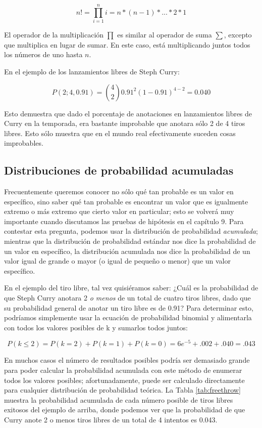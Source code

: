 \documentclass[
  12pt,
]{book}
\begin{document}
\[
n! = \prod_{i=1}^n i = n*(n-1)*...*2*1 
\]

El operador de la multiplicación \(\prod\) es similar al operador de suma \(\sum\), excepto que multiplica en lugar de sumar. En este caso, está multiplicando juntos todos los números de uno hasta \(n\).

En el ejemplo de los lanzamientos libres de Steph Curry:

\[
P(2;4,0.91) = \binom{4}{2} 0.91^2(1-0.91)^{4-2} = 0.040
\]

Esto demuestra que dado el porcentaje de anotaciones en lanzamientos libres de Curry en la temporada, era bastante improbable que anotara sólo 2 de 4 tiros libres. Esto sólo muestra que en el mundo real efectivamente suceden cosas improbables.

\hypertarget{distribuciones-de-probabilidad-acumuladas}{%
\subsection{Distribuciones de probabilidad acumuladas}\label{distribuciones-de-probabilidad-acumuladas}}

Frecuentemente queremos conocer no sólo qué tan probable es un valor en específico, sino saber qué tan probable es encontrar un valor que es igualmente extremo o más extremo que cierto valor en particular; esto se volverá muy importante cuando discutamos las pruebas de hipótesis en el capítulo 9. Para contestar esta pregunta, podemos usar la distribución de probabilidad \emph{acumulada}; mientras que la distribución de probabilidad estándar nos dice la probabilidad de un valor en específico, la distribución acumulada nos dice la probabilidad de un valor igual de grande o mayor (o igual de pequeño o menor) que un valor específico.

En el ejemplo del tiro libre, tal vez quisiéramos saber: ¿Cuál es la probabilidad de que Steph Curry anotara 2 \emph{o menos} de un total de cuatro tiros libres, dado que su probabilidad general de anotar un tiro libre es de 0.91? Para determinar esto, podríamos simplemente usar la ecuación de probabilidad binomial y alimentarla con todos los valores posibles de k y sumarlos todos juntos:

\[
P(k\le2)= P(k=2) + P(k=1) + P(k=0) = 6e^{-5} + .002 + .040 = .043  
\]

En muchos casos el número de resultados posibles podría ser demasiado grande para poder calcular la probabilidad acumulada con este método de enumerar todos los valores posibles; afortunadamente, puede ser calculado directamente para cualquier distribución de probabilidad teórica. La Tabla \ref{tab:freethrow} muestra la probabilidad acumulada de cada número posible de tiros libres exitosos del ejemplo de arriba, donde podemos ver que la probabilidad de que Curry anote 2 o menos tiros libres de un total de 4 intentos es 0.043.
\end{document}
